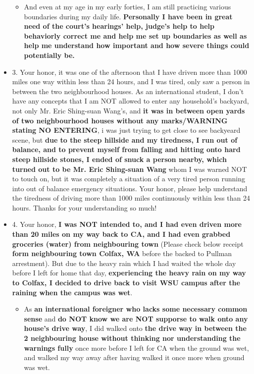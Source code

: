 \documentclass[9pt, b5paper]{article}
\begin{document}
\begin{itemize}
\begin{itemize}
\item And even at my age in my early forties, I am still practicing various boundaries during my daily life. \textbf{Personally I have been in great need of the court's hearings' help, judge's help to help behaviorly correct me and help me set up boundaries as well as help me understand how important and how severe things could potentially be.}
\end{itemize}
\item 3. Your honor, it was one of the afternoon that I have driven more than 1000 miles one way within less than 24 hours, and I was tired, only saw a person in between the two neighbourhood houses. As an international student, I don't have any concepts that I am NOT allowed to enter any household's backyard, not only Mr. Eric Shing-suan Wang's, and \textbf{it was in between open yards of two neighbourhood houses without any marks/WARNING stating NO ENTERING}, i was just trying to get close to see backyeard scene, but \textbf{due to the steep hillside and my tiredness, I run out of balance, and to prevent myself from falling and hitting onto hard steep hillside stones, I ended of snuck a person nearby, which turned out to be Mr. Eric Shing-suan Wang} whom I was warned NOT to touch on, but it was completely a situation of a very tired person running into out of balance emergency situations. Your honor, please help understand the tiredness of driving more than 1000 miles continuously within less than 24 hours. Thanks for your understanding so much!
\item 4. Your honor, \textbf{I was NOT intended to, and I had even driven more than 20 miles on my way back to CA, and I had even grabbed groceries (water) from neighbouring town} (Please check below receipt \textbf{form neighbouring town Colfax, WA} before the backed to Pullman arrestment). But due to the heavy rain which I had waited the whole day before I left for home that day, \textbf{experiencing the heavy rain on my way to Colfax, I decided to drive back to visit WSU campus after the raining when the campus was wet}. 
\begin{itemize}
\item As \textbf{an international foreigner who lacks some necessary common sense} and \textbf{do NOT know we are NOT supporse to walk onto any house's drive way}, I did walked onto \textbf{the drive way in between the 2 neighbouring house without thinking nor understanding the warnings fully} once more before I left for CA when the ground was wet, and walked my way away after having walked it once more when ground was wet.

\end{itemize}
\end{itemize}
\end{document}
